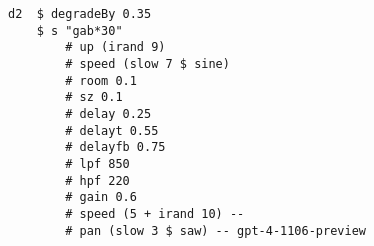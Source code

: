





\begin{minipage}[t]{1\textwidth}
    \centering
    \begin{lstlisting}[style=SuperCollider-IDE, language=ExtendedHaskell, basicstyle=\footnotesize\ttfamily, numbers=none]
d2  $ degradeBy 0.35 
    $ s "gab*30" 
        # up (irand 9) 
        # speed (slow 7 $ sine) 
        # room 0.1 
        # sz 0.1 
        # delay 0.25 
        # delayt 0.55 
        # delayfb 0.75 
        # lpf 850 
        # hpf 220 
        # gain 0.6 
        # speed (5 + irand 10) -- 
        # pan (slow 3 $ saw) -- gpt-4-1106-preview                  
    \end{lstlisting}
    \vspace{1cm}
\end{minipage}












